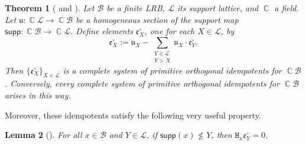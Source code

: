 \documentclass[11pt, oneside, reqno]{amsart}
\newtheorem{theorem}{Theorem}[section]
\newtheorem{lemma}[theorem]{Lemma}
\theoremstyle{definition}
\numberwithin{equation}{section}
\DeclareMathOperator{\C}{\mathbb{C}}
\def \BB{{\mathcal{B}}}
\def \kk{\C}
\def \lat{{\mathcal{L}}}
\def \uu{{\mathfrak{u}}}
\def \ee{{\mathfrak{e}}}
\def \supp{\mathsf{supp}}
\newcommand{\B}[1]{\mathtt{#1}} 			%
\begin{document}
\begin{theorem}[{\cite[Theorem~4.2]{saliola07quiverLRB} and \cite[Prop. 11.9]{am17}}] \label{thm:CSoPOIforLRB}
    Let $\BB$ be a finite LRB, $\lat$ its support lattice, and $\kk$ a field.
    Let $\uu: \kk\lat \xrightarrow{} \kk\BB$ be a homogeneous section of the support map
    $\supp: \kk\BB \to \kk\lat$.
    Define elements $\ee^\circ_X$, one for each $X \in \lat$, by
    \begin{equation}\label{eq:saliolarecursion}
    \ee^{\circ}_{X}:= \uu_{X} - \sum_{\substack{Y \in \lat \\ Y > X}} \uu_{X}\cdot \ee^{\circ}_{Y}. \end{equation}
    Then $\{ \ee^\circ_X \}_{X \in \lat}$ is a complete system of primitive orthogonal idempotents for $\kk \BB$.
    Conversely, every complete system of primitive orthogonal idempotents for $\kk\BB$ arises in this way.
\end{theorem}

Moreover, these idempotents satisfy the following very useful property.

\begin{lemma}[{\cite[Lemma 5.1]{saliola2009face}}]
    \label{lem:Saliola's}
    For all $x \in \BB$ and $Y \in \lat$, if $\supp(x) \not\leq Y$, then $\B{H}_x \ee^\circ_Y = 0$.
\end{lemma}
\end{document}
